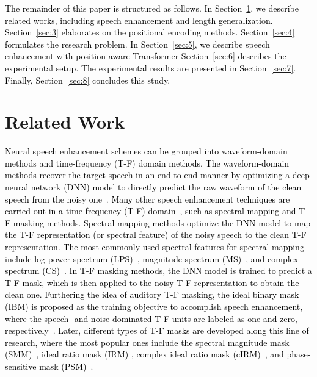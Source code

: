 \documentclass[journal]{IEEEtran}
\begin{document}
\textcolor{black}{The remainder of this paper is structured as follows. In Section~\ref{sec:2}, we describe related works, including speech enhancement and length generalization. Section~\ref{sec:3} elaborates on the positional encoding methods. Section~\ref{sec:4} formulates the research problem. \textcolor{black}{In Section~\ref{sec:5}, we describe speech enhancement with position-aware Transformer Section~\ref{sec:6} describes the experimental setup. The experimental results are presented in Section~\ref{sec:7}. Finally, Section~\ref{sec:8} concludes this study.}}



\section{Related Work} \label{sec:2}
\textcolor{black}{Neural speech enhancement schemes can be grouped into waveform-domain methods and time-frequency (T-F) domain methods. The waveform-domain methods recover the target speech in an end-to-end manner by optimizing a deep neural network (DNN) model to directly predict the raw waveform of the clean speech from the noisy one~\cite{SEGAN,2017raw, kolbaek2020loss,2018raw,demcus,cleanunet}. Many other speech enhancement techniques are carried out in a time-frequency (T-F)  domain~\cite{overview2018,over2022}, such as spectral mapping and T-F masking methods. Spectral mapping methods optimize the DNN model to map the T-F representation (or spectral feature) of the noisy speech to the clean T-F representation. The most commonly used spectral features for spectral mapping include log-power spectrum (LPS)~\cite{yongxu2015}, magnitude spectrum (MS)~\cite{crn2018,GRN,restcnsa,sa-tcn}, and complex spectrum (CS)~\cite{2018complex,tan2019learning}. In T-F masking methods, the DNN model is trained to predict a T-F mask, which is then applied to the noisy T-F representation to obtain the clean one. Furthering the idea of auditory T-F masking, the ideal binary mask (IBM) is proposed as the training objective to accomplish speech enhancement, where the speech- and noise-dominated T-F units are labeled as one and zero, respectively~\cite{wang2013}. Later, different types of T-F masks are developed along this line of research, where the most popular ones include the spectral magnitude mask (SMM)~\cite{targets}, ideal ratio mask (IRM) \cite{targets}, complex ideal ratio mask (cIRM)~\cite{cirm}, and phase-sensitive mask (PSM)~\cite{psm}.}
\end{document}
